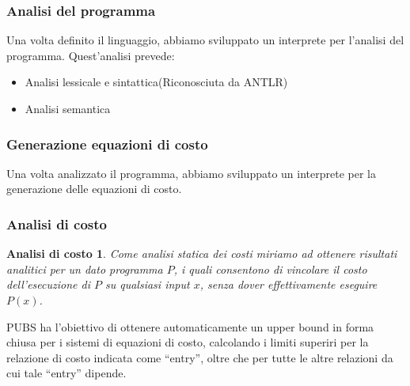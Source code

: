 \documentclass[xcolor=dvipsnames]{beamer}
\begin{document}
\begin{frame}
    \frametitle{Analisi del programma}
    Una volta definito il linguaggio, abbiamo sviluppato un interprete per l'analisi del programma.
    Quest'analisi prevede:
    \begin{itemize}
        \item<1-> Analisi lessicale e sintattica(Riconosciuta da ANTLR)
        \item<2-> Analisi semantica 
    \end{itemize}
\end{frame}

\begin{frame}
    \frametitle{Generazione equazioni di costo}
    Una volta analizzato il programma, abbiamo sviluppato un interprete per la generazione delle equazioni di costo.
\end{frame}

\begin{frame}
    \frametitle{Analisi di costo}
    
    \newtheorem{Analisi di costo}{Analisi di costo}

    \begin{Analisi di costo}
        Come \alert{analisi statica dei costi} miriamo ad ottenere risultati analitici per un dato programma $P$, i quali consentono di vincolare il costo dell'esecuzione di $P$ su qualsiasi input $x$, senza dover effettivamente eseguire $P(x)$.
    \end{Analisi di costo}
   
    PUBS ha l'obiettivo di ottenere automaticamente un upper bound in forma chiusa per i sistemi di equazioni di costo, calcolando i limiti superiri per la relazione di costo indicata come ``entry'', oltre che per tutte le altre relazioni da cui tale ``entry'' dipende.
\end{frame}
\end{document}
